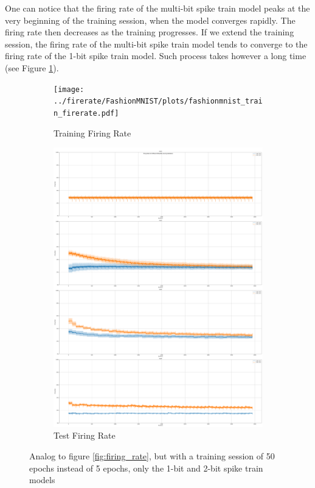        One can notice that the firing rate of the multi-bit spike train model peaks at the very beginning of the training session, when the model converges rapidly. The firing rate then decreases as the training progresses. If we extend the training session, the firing rate of the multi-bit spike train model tends to converge to the firing rate of the 1-bit spike train model. Such process takes however a long time (see Figure \ref{fig:long_firing_rate}). 
        \begin{figure}[!htpb]
            \centering
            \begin{subfigure}[H]{0.48\textwidth}
                \centering
                \texttt{[image: ../firerate/FashionMNIST/plots/fashionmnist\_train\_firerate.pdf]}
                \caption{Training Firing Rate}
            \end{subfigure}
            \hfill
            \begin{subfigure}[H]{0.48\textwidth}
                \centering
                \includegraphics[width=\textwidth]{../firerate/FashionMNIST/plots/fashionmnist_test_firerate.pdf}
                \caption{Test Firing Rate}
            \end{subfigure}
            \caption{Analog to figure \ref{fig:firing_rate}, but with a training session of 50 epochs instead of 5 epochs, only the 1-bit and 2-bit spike train models}
            \label{fig:long_firing_rate}
        \end{figure}

